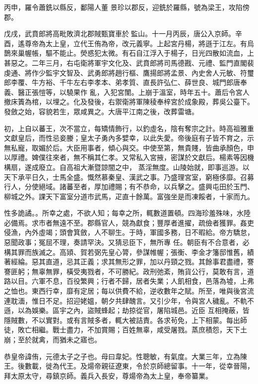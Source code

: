 \begin{pinyinscope}
 丙申，羅令蕭銑以縣反，鄱陽人董
 景珍以郡反，迎銑於羅縣，號為梁王，攻陷傍郡。



 戊戌，武賁郎將高毗敗濟北郡賊甄寶車於監山。十一月丙辰，唐公入京師。辛酉，遙尊帝為太上皇，立代王侑為帝，改元義寧。上起宮丹楊，將遜于江左。有烏鵲來巢幄帳，驅不能止。熒惑犯太微。有石自江浮入于楊子，日光四散如流血，上甚惡之。二年三月，右屯衛將軍宇文化及、武賁郎將司馬德戡、元禮、監門直閣裴虔通、將作少監宇文智及、武勇郎將趙行樞、鷹揚郎將孟景、內史舍人元敏、符璽郎李覆、牛方裕、千牛左右李孝本、弟孝質、直長許弘仁、薛世良、城門郎唐奉義、醫正張愷等，以驍果作
 亂，入犯宮闈。上崩于溫室，時年五十。蕭后令宮人撤床簀為棺，以埋之。化及發後，右禦衛將軍陳稜奉梓宮於成象殿，葬吳公臺下。發斂之始，容貌若生，眾咸異之。大唐平江南之後，改葬雷塘。



 初，上自以蕃王，次不當立，每矯情飾行，以釣虛名，陰有奪宗之計。時高祖雅重文獻皇后，而性忌妾媵；皇太子勇內多嬖幸，以此失愛。帝後庭有子皆不育之，示無私寵，取媚於后。大臣用事者，傾心與交。中使至第，無貴賤，皆曲承顏色，申以厚禮。婢僕往來者，無不稱其仁孝。又常私入宮掖，密謀於文獻后。楊素等因機構扇，遂成廢立。自高祖大漸暨諒闇之中，
 蒸淫無度。山陵始就，即事巡游。以天下承平日久，士馬全盛。慨然慕秦皇、漢武之事。乃盛理宮室，窮極侈靡。召募行人，分使絕域。諸蕃至者，厚加禮賜；有不恭命，以兵擊之。盛興屯田於玉門、柳城之外。課天下富室分道市武馬，疋直十餘萬。富強坐是而凍餒者，十家而九。



 性多詭譎。。所幸之處，不欲人知；每幸之所，輒數道置頓。四海珍羞殊味，水陸必備焉。求市者無遠不至。郡縣官人，競為獻食；豐厚者進擢，疏儉者獲罪。姦吏侵漁，內外虛竭；頭會箕斂，人不聊生。于時，軍國多務，日不暇給。帝方驕怠，惡聞政事；冤屈不理，奏請罕決。又猜忌臣下，無所專
 任。朝臣有不合意者，必構其罪而族滅之。高熲、賀若弼先皇心膂，參謀帷幄；張衡、李金才籓邸惟舊，績著經綸。惡其直道，忌其正義；求其無形之罪，加以丹頸之戮。其餘事君盡禮，謇謇匪躬；無辜無罪，橫受夷戮者，不可勝紀。政刑弛紊，賄貨公行，莫敢有言，道路以目。六軍不息，百役繁興；行者不歸，居者失業；人飢相食，邑落為墟，上弗之恤也。東西行幸，靡有定居；每以供費不給，逆收數年之賦。所至，唯與後宮流連耽湎，惟日不足。招迎姥媼，朝夕共肆醜言。又引少年，令與宮人穢亂。不軌不遜，以為娛樂。區宇之內，盜賊蜂起；劫掠從官，屠陷城邑。近臣
 互相掩蔽，皆隱賊數，不以實對。或有言賊多者，輒大被詰責。各求茍免，上下相蒙。每出師徒，敗亡相繼。戰士盡力，不加賞賜；百姓無辜，咸受屠戮。蒸庶積怨，天下土崩；至於就禽，而猶未之寤也。



 恭皇帝諱侑，元德太子之子也。母曰韋妃。性聰敏，有氣度。大業三年，立為陳王。後數載，徙為代王。及煬帝親征遼東，令於京師總留事。十一年，從幸晉陽，拜太原太守，尋鎮京師。義兵入長安，尊煬帝為太上皇，奉帝纂業。




\end{pinyinscope}
